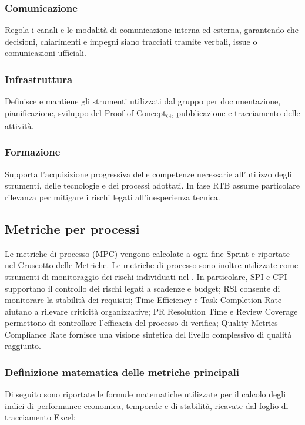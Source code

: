 \subsubsection{Comunicazione}
Regola i canali e le modalità di comunicazione interna ed esterna, garantendo che decisioni, chiarimenti e impegni siano tracciati tramite verbali, issue o comunicazioni ufficiali.

\subsubsection{Infrastruttura}
Definisce e mantiene gli strumenti utilizzati dal gruppo per documentazione, pianificazione, sviluppo del Proof of Concept\textsubscript{G}, pubblicazione e tracciamento delle attività.

\subsubsection{Formazione}
Supporta l'acquisizione progressiva delle competenze necessarie all'utilizzo degli strumenti, delle tecnologie e dei processi adottati. In fase RTB assume particolare rilevanza per mitigare i rischi legati all'inesperienza tecnica.

\subsection{Metriche per processi}
Le metriche di processo (MPC) vengono calcolate a ogni fine Sprint e riportate nel Cruscotto delle Metriche.
Le metriche di processo sono inoltre utilizzate come strumenti di monitoraggio dei rischi individuati nel 
. 
In particolare, SPI e CPI supportano il controllo dei rischi legati a scadenze e budget; RSI consente di monitorare la stabilità dei requisiti; 
Time Efficiency e Task Completion Rate aiutano a rilevare criticità organizzative; PR Resolution Time e Review Coverage permettono di controllare 
l'efficacia del processo di verifica; Quality Metrics Compliance Rate fornisce una visione sintetica del livello complessivo di qualità raggiunto.

\vspace{0.5cm}
\subsubsection*{Definizione matematica delle metriche principali}
Di seguito sono riportate le formule matematiche utilizzate per il calcolo degli indici di performance economica, temporale e di stabilità, ricavate dal foglio di tracciamento Excel:

